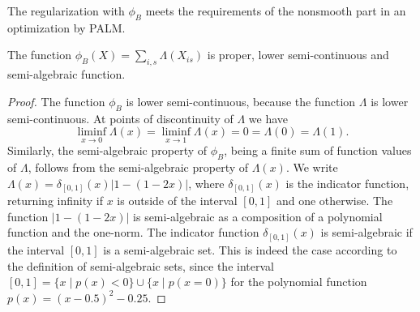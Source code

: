 The regularization with $\phi_B$ meets the requirements of the nonsmooth part in an optimization by PALM. 
\begin{lemma}
The function $\phi_B(X)=\sum_{i,s}\Lambda(X_{is})$ is proper, lower semi-continuous and semi-algebraic function.
\end{lemma}
\begin{proof}
The function $\phi_B$ is lower semi-continuous, because the function $\Lambda$ is lower semi-continuous. At points of discontinuity of $\Lambda$ we have
\[\liminf_{x\rightarrow 0}\Lambda(x)=\liminf_{x\rightarrow 1}\Lambda(x)=0=\Lambda(0)=\Lambda(1).\]
Similarly, the semi-algebraic property of $\phi_B$, being a finite sum of function values of $\Lambda$, follows from the semi-algebraic property of $\Lambda(x)$. We write $\Lambda(x)=\delta_{[0,1]}(x)\lvert 1-(1-2x)\rvert $, where $\delta_{[0,1]}(x)$ is the indicator function, returning infinity if $x$ is outside of the interval $[0,1]$ and one otherwise. The function $\lvert 1-(1-2x)\rvert $ is semi-algebraic as a composition of a polynomial function and the one-norm. The indicator function $\delta_{[0,1]}(x)$ is semi-algebraic if the interval $[0,1]$ is a semi-algebraic set. This is indeed the case according to the definition of semi-algebraic sets, since the interval $[0,1]=\{x\mid p(x)<0\}\cup\{x\mid p(x=0)\}$ for the polynomial function $p(x)=(x-0.5)^2-0.25$.
\end{proof}
